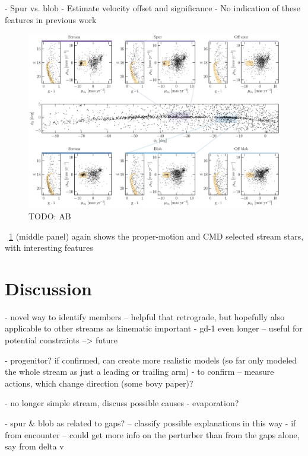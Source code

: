 \documentclass[modern]{aastex62}
\newcommand{\todo}[1]{{\color{red} TODO: #1}}
\begin{document}
- Spur vs. blob
- Estimate velocity offset and significance
- No indication of these features in previous work

\begin{figure}[h]
\begin{center}
\includegraphics[width=\textwidth]{features.pdf}
\end{center}
\caption{%
\todo{AB}
\label{fig:features}
}
\end{figure}

\figurename~\ref{fig:features} (middle panel) again shows the proper-motion and CMD selected stream stars, with interesting features

\section{Discussion}
\label{sec:discussion}

- novel way to identify members -- helpful that retrograde, but hopefully also applicable to other streams as kinematic important
- gd-1 even longer -- useful for potential constraints --> future

- progenitor? if confirmed, can create more realistic models (so far only modeled the whole stream as just a leading or trailing arm)
- to confirm -- measure actions, which change direction (some bovy paper)?

- no longer simple stream, discuss possible causes
- evaporation?

- spur & blob as related to gaps? -- classify possible explanations in this way
- if from encounter -- could get more info on the perturber than from the gaps alone, say from delta v
\end{document}
